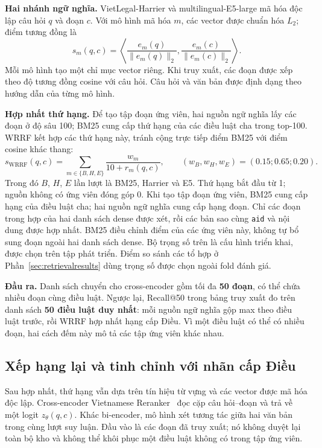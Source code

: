 \documentclass[12pt,a4paper]{article}
\newcommand{\id}[1]{\texttt{#1}}
\begin{document}
\textbf{Hai nhánh ngữ nghĩa.} VietLegal-Harrier và multilingual-E5-large mã hóa độc lập câu hỏi $q$ và đoạn $c$. Với mô hình mã hóa $m$, các vector được chuẩn hóa $L_2$; điểm tương đồng là
\begin{equation}
s_m(q,c)=\left\langle \frac{e_m(q)}{\|e_m(q)\|_2},\frac{e_m(c)}{\|e_m(c)\|_2}\right\rangle.\label{eq:dense}
\end{equation}
Mỗi mô hình tạo một chỉ mục vector riêng. Khi truy xuất, các đoạn được xếp theo độ tương đồng cosine với câu hỏi. Câu hỏi và văn bản được định dạng theo hướng dẫn của từng mô hình.

\textbf{Hợp nhất thứ hạng.} Để tạo tập đoạn ứng viên, hai nguồn ngữ nghĩa lấy các đoạn ở độ sâu 100; BM25 cung cấp thứ hạng của các điều luật cha trong top-100. WRRF kết hợp các thứ hạng này, tránh cộng trực tiếp điểm BM25 với điểm cosine khác thang:
\begin{equation}
s_{\mathrm{WRRF}}(q,c)=\sum_{m\in\{B,H,E\}}\frac{w_m}{10+r_m(q,c)},\qquad
(w_B,w_H,w_E)=(0.15;0.65;0.20).\label{eq:wrrf}
\end{equation}
Trong đó $B$, $H$, $E$ lần lượt là BM25, Harrier và E5. Thứ hạng bắt đầu từ 1; nguồn không có ứng viên đóng góp 0. Khi tạo tập đoạn ứng viên, BM25 cung cấp hạng của điều luật cha; hai nguồn ngữ nghĩa cung cấp hạng đoạn. Chỉ các đoạn trong hợp của hai danh sách dense được xét, rồi các bản sao cùng \id{aid} và nội dung được hợp nhất. BM25 điều chỉnh điểm của các ứng viên này, không tự bổ sung đoạn ngoài hai danh sách dense. Bộ trọng số trên là cấu hình triển khai, được chọn trên tập phát triển. Điểm so sánh các tổ hợp ở Phần~\ref{sec:retrievalresults} dùng trọng số được chọn ngoài fold đánh giá.

\textbf{Đầu ra.} Danh sách chuyển cho cross-encoder gồm tối đa \textbf{50 đoạn}, có thể chứa nhiều đoạn cùng điều luật. Ngược lại, Recall@50 trong bảng truy xuất đo trên danh sách \textbf{50 điều luật duy nhất}: mỗi nguồn ngữ nghĩa gộp max theo điều luật trước, rồi WRRF hợp nhất hạng cấp Điều. Vì một điều luật có thể có nhiều đoạn, hai cách đếm này mô tả các tập ứng viên khác nhau.
\clearpage
\subsection{Xếp hạng lại và tinh chỉnh với nhãn cấp Điều}
Sau hợp nhất, thứ hạng vẫn dựa trên tín hiệu từ vựng và các vector được mã hóa độc lập. Cross-encoder Vietnamese Reranker~\cite{vnreranker} đọc cặp câu hỏi--đoạn và trả về một logit $z_\theta(q,c)$. Khác bi-encoder, mô hình xét tương tác giữa hai văn bản trong cùng lượt suy luận. Đầu vào là các đoạn đã truy xuất; nó không duyệt lại toàn bộ kho và không thể khôi phục một điều luật không có trong tập ứng viên.
\end{document}
